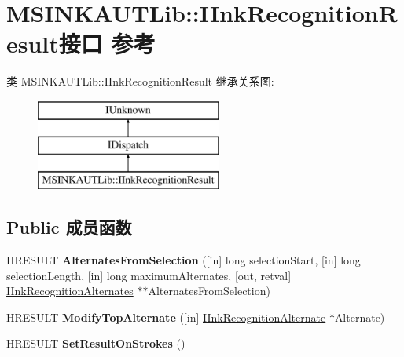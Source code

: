 \hypertarget{interface_m_s_i_n_k_a_u_t_lib_1_1_i_ink_recognition_result}{}\section{M\+S\+I\+N\+K\+A\+U\+T\+Lib\+:\+:I\+Ink\+Recognition\+Result接口 参考}
\label{interface_m_s_i_n_k_a_u_t_lib_1_1_i_ink_recognition_result}
类 M\+S\+I\+N\+K\+A\+U\+T\+Lib\+:\+:I\+Ink\+Recognition\+Result 继承关系图\+:\begin{figure}[H]
\begin{center}
\leavevmode
\includegraphics[height=3.000000cm]{interface_m_s_i_n_k_a_u_t_lib_1_1_i_ink_recognition_result}
\end{center}
\end{figure}
\subsection*{Public 成员函数}
\begin{DoxyCompactItemize}
\item 
\mbox{\label{interface_m_s_i_n_k_a_u_t_lib_1_1_i_ink_recognition_result_a8cdd68c688a9ded7668b5febdbc3ef50}} 
H\+R\+E\+S\+U\+LT {\bfseries Alternates\+From\+Selection} (\mbox{[}in\mbox{]} long selection\+Start, \mbox{[}in\mbox{]} long selection\+Length, \mbox{[}in\mbox{]} long maximum\+Alternates, \mbox{[}out, retval\mbox{]} \hyperlink{interface_m_s_i_n_k_a_u_t_lib_1_1_i_ink_recognition_alternates}{I\+Ink\+Recognition\+Alternates} $\ast$$\ast$Alternates\+From\+Selection)
\item 
\mbox{\label{interface_m_s_i_n_k_a_u_t_lib_1_1_i_ink_recognition_result_a8f2a50690507b516e68367b2ca43fed6}} 
H\+R\+E\+S\+U\+LT {\bfseries Modify\+Top\+Alternate} (\mbox{[}in\mbox{]} \hyperlink{interface_m_s_i_n_k_a_u_t_lib_1_1_i_ink_recognition_alternate}{I\+Ink\+Recognition\+Alternate} $\ast$Alternate)
\item 
\mbox{\label{interface_m_s_i_n_k_a_u_t_lib_1_1_i_ink_recognition_result_afdfada6d7b5d7d734bbf7c75e7404135}} 
H\+R\+E\+S\+U\+LT {\bfseries Set\+Result\+On\+Strokes} ()
\end{DoxyCompactItemize}
